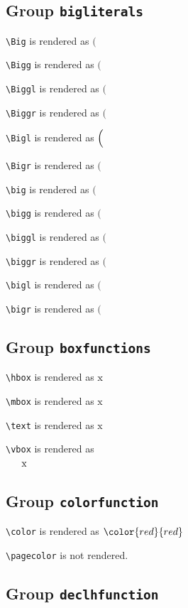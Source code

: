 \subsection{ Group \texttt{big\textunderscore literals}}

\texttt{\textbackslash Big} is rendered as $\Big($

\texttt{\textbackslash Bigg} is rendered as $\Bigg($

\texttt{\textbackslash Biggl} is rendered as $\Biggl($

\texttt{\textbackslash Biggr} is rendered as $\Biggr($

\texttt{\textbackslash Bigl} is rendered as $\Bigl($

\texttt{\textbackslash Bigr} is rendered as $\Bigr($

\texttt{\textbackslash big} is rendered as $\big($

\texttt{\textbackslash bigg} is rendered as $\bigg($

\texttt{\textbackslash biggl} is rendered as $\biggl($

\texttt{\textbackslash biggr} is rendered as $\biggr($

\texttt{\textbackslash bigl} is rendered as $\bigl($

\texttt{\textbackslash bigr} is rendered as $\bigr($

\subsection{ Group \texttt{box\textunderscore functions}}

\texttt{\textbackslash hbox} is rendered as $\hbox{x}$

\texttt{\textbackslash mbox} is rendered as $\mbox{x}$

\texttt{\textbackslash text} is rendered as $\text{x}$

\texttt{\textbackslash vbox} is rendered as $\vbox{x}$

\subsection{ Group \texttt{color\textunderscore function}}

\texttt{\textbackslash color} is rendered as $\color{red}{red}$

\texttt{\textbackslash pagecolor} is not rendered.

\subsection{ Group \texttt{declh\textunderscore function}}

